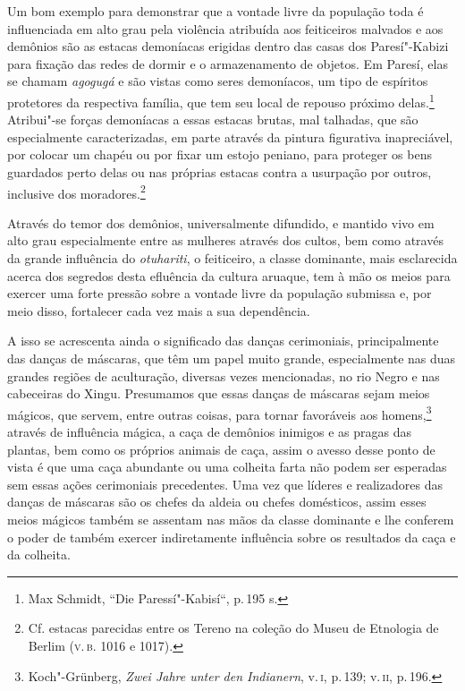 Um bom exemplo para demonstrar que a vontade livre da população toda é
influenciada em alto grau pela violência atribuída aos feiticeiros
malvados e aos demônios são as estacas demoníacas erigidas dentro das
casas dos Paresí"-Kabizi para fixação das redes de dormir e o
armazenamento de objetos. Em Paresí, elas se chamam \textit{agogugá} e são
vistas como seres demoníacos, um tipo de espíritos protetores da
respectiva família, que tem seu local de repouso próximo delas.\footnote{Max
  Schmidt, ``Die Paressí"-Kabisí``, p.\,195 s.} Atribui"-se forças
demoníacas a essas estacas brutas, mal talhadas, que são especialmente
caracterizadas, em parte através da pintura figurativa inapreciável, por
colocar um chapéu ou por fixar um estojo peniano, para proteger os bens
guardados perto delas ou nas próprias estacas contra a usurpação por
outros, inclusive dos moradores.\footnote{Cf. estacas parecidas entre os
  Tereno na coleção do Museu de Etnologia de Berlim (\textsc{v.\,b.} 1016 e 1017).}


Através do temor dos demônios, universalmente difundido, e mantido vivo
em alto grau especialmente entre as mulheres através dos cultos, bem
como através da grande influência do \textit{otuhariti}, o feiticeiro, a
classe dominante, mais esclarecida acerca dos segredos desta efluência
da cultura aruaque, tem à mão os meios para exercer uma forte pressão
sobre a vontade livre da população submissa e, por meio disso,
fortalecer cada vez mais a sua dependência.

A isso se acrescenta ainda o significado das danças cerimoniais,
principalmente das danças de máscaras, que têm um papel muito grande,
especialmente nas duas grandes regiões de aculturação, diversas vezes
mencionadas, no rio Negro e nas cabeceiras do Xingu. Presumamos que
essas danças de máscaras sejam meios mágicos, que servem, entre outras
coisas, para tornar favoráveis aos homens,\footnote{Koch"-Grünberg,
  \textit{Zwei Jahre unter den Indianern}, v.\,\textsc{i}, p.\,139; v.\,\textsc{ii}, p.\,196.}
através de influência mágica, a caça de demônios inimigos e as pragas
das plantas, bem como os próprios animais de caça, assim o avesso desse
ponto de vista é que uma caça abundante ou uma colheita farta não podem
ser esperadas sem essas ações cerimoniais precedentes. Uma vez que
líderes e realizadores das danças de máscaras são os chefes da aldeia ou
chefes domésticos, assim esses meios mágicos também se assentam nas
mãos da classe dominante e lhe conferem o poder de também exercer
indiretamente influência sobre os resultados da caça e da colheita.


